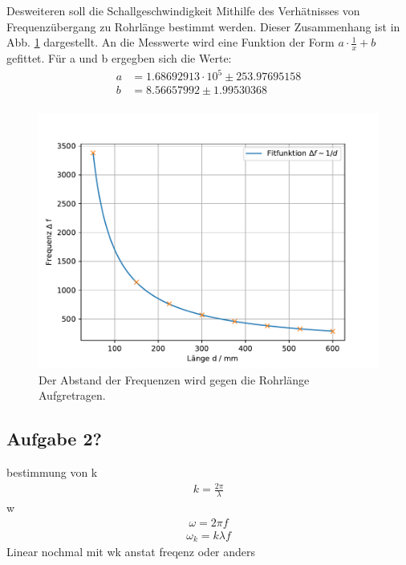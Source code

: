 \FloatBarrier
Desweiteren soll die Schallgeschwindigkeit Mithilfe des Verhätnisses von Frequenzübergang zu Rohrlänge bestimmt werden.
Dieser Zusammenhang ist in Abb. \ref{fig.1/x} dargestellt.
An die Messwerte wird eine Funktion der Form $a\cdot\frac{1}{x}+b$ gefittet.
Für a und b ergegben sich die Werte:
\begin{align*}
  a&=1.68692913\cdot10^5\pm253.97695158\\
  b&=8.56657992\pm1.99530368\\
\end{align*}
\begin{figure}[h!]
  \centering
  \includegraphics[width=\textwidth]{geschi.pdf}
  \caption{Der Abstand der Frequenzen wird gegen die Rohrlänge Aufgretragen.}
  \label{fig.1/x}
\end{figure}

\subsection{Aufgabe 2?}
bestimmung von k
\begin{align*}
  k= \frac{2\pi}{\lambda}
\end{align*}
w
\begin{align*}
  \omega=2\pi f
\end{align*}
\begin{align*}
  \omega_k=k\lambda f
\end{align*}
Linear nochmal mit wk anstat freqenz oder anders 
